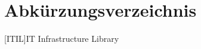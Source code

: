 \chapter{Abkürzungsverzeichnis}

\begin{acronym}
[ITIL\textsuperscript{\textregistered}]{IT Infrastructure Library}
\end{acronym}

